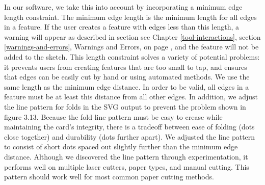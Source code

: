 In our software, we take this into account by incorporating a minimum
edge length constraint. The minimum edge length is the minimum length
for all edges in a feature. If the user creates a feature with edges
less than this length, a warning will appear as described in section see
Chapter \ref{tool-interactions}, section \ref{warnings-and-errors},
Warnings and Errors, on page \pageref{warnings-and-errors}, and the
feature will not be added to the sketch. This length constraint solves a
variety of potential problems: it prevents users from creating features
that are too small to tap, and ensures that edges can be easily cut by
hand or using automated methods. We use the same length as the minimum
edge distance. In order to be valid, all edges in a feature must be at
least this distance from all other edges. In addition, we adjust the
line pattern for folds in the SVG output to prevent the problem shown in
figure 3.13. Because the fold line pattern must be easy to crease while
maintaining the card's integrity, there is a tradeoff between ease of
folding (dots close together) and durability (dots further apart). We
adjusted the line pattern to consist of short dots spaced out slightly
further than the minimum edge distance. Although we discovered the line
pattern through experimentation, it performs well on multiple laser
cutters, paper types, and manual cutting. This pattern should work well
for most common paper cutting methods.
